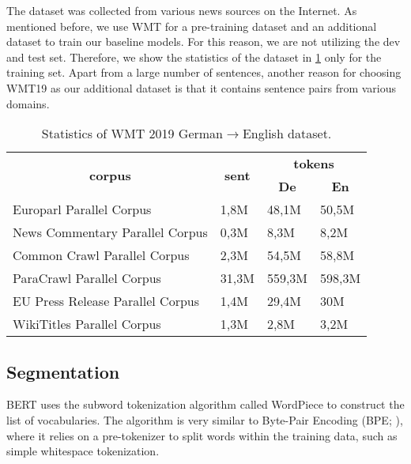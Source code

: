 The dataset was collected from various news sources on the Internet. As mentioned before, we use WMT for a pre-training dataset and an additional dataset to train our baseline models. For this reason, we are not utilizing the dev and test set. Therefore, we show the statistics of the dataset in \cref{tab:wmt19stat} only for the training set. Apart from a large number of sentences, another reason for choosing WMT19 as our additional dataset is that it contains sentence pairs from various domains.

\begin{table}[h]
    \centering
    \begin{tabular}{@{}llll@{}}
        \toprule
        \multicolumn{1}{c}{\multirow{2}{*}{\textbf{corpus}}} &
        \multicolumn{1}{c}{\multirow{2}{*}{\textbf{sent}}}   &
        \multicolumn{2}{c}{\textbf{tokens}}                                            \\
        \multicolumn{1}{c}{}                                 &
        \multicolumn{1}{c}{}                                 &
        \multicolumn{1}{c}{\textbf{De}}                      &
        \multicolumn{1}{c}{\textbf{En}}                                                \\ \midrule
        Europarl Parallel Corpus                             & 1,8M  & 48,1M  & 50,5M  \\
        News Commentary Parallel Corpus                      & 0,3M  & 8,3M   & 8,2M   \\
        Common Crawl Parallel Corpus                         & 2,3M  & 54,5M  & 58,8M  \\
        ParaCrawl Parallel Corpus                            & 31,3M & 559,3M & 598,3M \\
        EU Press Release Parallel Corpus                     & 1,4M  & 29,4M  & 30M    \\
        WikiTitles Parallel Corpus                           & 1,3M  & 2,8M   & 3,2M   \\ \bottomrule
    \end{tabular}
    \caption{Statistics of WMT 2019 German$\rightarrow$English dataset.}
    \label{tab:wmt19stat}
\end{table}

\subsection{Segmentation}
BERT uses the subword tokenization algorithm called WordPiece  to construct the list of vocabularies. The algorithm is very similar to Byte-Pair Encoding (BPE; \cite{sennrich-etal-2016-neural}), where it relies on a pre-tokenizer to split words within the training data, such as simple whitespace tokenization.

